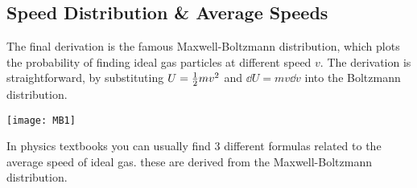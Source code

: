 \documentclass[class=article, crop=false, 12pt]{standalone}
\begin{document}
\newpage
\subsection{Speed Distribution \& Average Speeds}

The final derivation is the famous Maxwell-Boltzmann distribution,
which plots the probability of finding ideal gas particles at different speed $v$.
The derivation is straightforward,
by substituting $U = \frac{1}{2} mv^2$ and $\dd{U}=mv\dd{v}$ into the Boltzmann distribution.

\begin{center}
    \begin{minipage}{0.8\linewidth}
        \centering
        \texttt{[image: MB1]}
    \end{minipage}
\end{center}


In physics textbooks you can usually find 3 different formulas related to the average speed of ideal gas. 
these are derived from the Maxwell-Boltzmann distribution.
\end{document}
